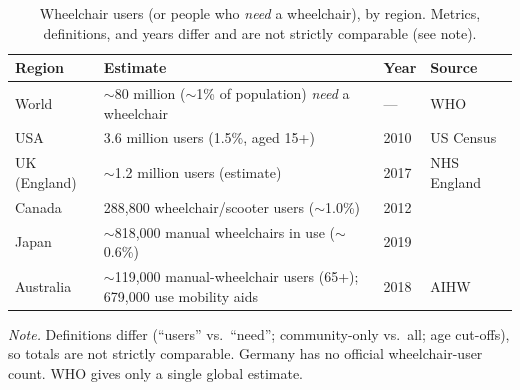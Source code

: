 \begin{table}[tbp]
\caption{Wheelchair users (or people who \emph{need} a wheelchair), by region. Metrics,
definitions, and years differ and are not strictly comparable (see note).}
\label{tab:wheelchair}
\small
\setlength{\tabcolsep}{4pt}
\begin{tabular}{@{}lp{5.2cm}ll@{}}
\toprule
Region & Estimate & Year & Source \\
\midrule
World & $\sim$80 million ($\sim$1\% of population) \emph{need} a wheelchair & --- & WHO~\cite{who_wheelchair2023,who_great2022} \\
USA & 3.6 million users (1.5\%, aged 15+) & 2010 & US Census~\cite{us_census_disability2010} \\
UK (England) & $\sim$1.2 million users (estimate) & 2017 & NHS England~\cite{nhs_wheelchair} \\
Canada & 288{,}800 wheelchair/scooter users ($\sim$1.0\%) & 2012 & \cite{wc_canada_smith2016} \\
Japan & $\sim$818{,}000 manual wheelchairs in use ($\sim$0.6\%) & 2019 & \cite{wc_japan_shirogane2019} \\
Australia & $\sim$119{,}000 manual-wheelchair users (65+); 679{,}000 use mobility aids & 2018 & AIHW~\cite{wc_australia_aihw} \\
\bottomrule
\end{tabular}

\smallskip
{\footnotesize \emph{Note.} Definitions differ (``users'' vs.\ ``need''; community-only
vs.\ all; age cut-offs), so totals are not strictly comparable. Germany has no official
wheelchair-user count. WHO gives only a single global estimate.}
\end{table}

